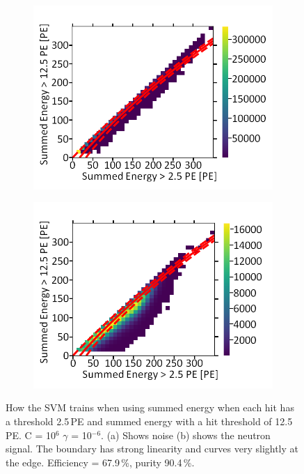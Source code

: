 \begin{figure}[!h]
\centering
\begin{subfigure}{.5\textwidth}
  \centering
  \includegraphics[width=\linewidth]{Appendix1/Figs/Sum1Sum2Noise.png}
  \captionsetup{width=.9\linewidth}
  \caption{}
  \label{subFig:Sum1Sum2N}
\end{subfigure}%
\begin{subfigure}{.5\textwidth}
  \centering
\includegraphics[width=\linewidth]{Appendix1/Figs/Sum1Sum2Signal.png}
  \captionsetup{width=.9\linewidth}
  \caption{}
  \label{subFig:Sum1Sum2S}
\end{subfigure}
\caption[LIBLINEAR SVM Nyström approximated RBF kernel for summed energy > 12.5\,PE vs summed energy > 2.5\,PE.]{How the SVM trains when using summed energy when each hit has a threshold 2.5\,PE and summed energy with a hit threshold of 12.5\,PE. C = 10$^6$ $\gamma$ = 10$^{-6}$. (a) Shows noise (b) shows the neutron signal. The boundary has strong linearity and curves very slightly at the edge. Efficiency = 67.9\,\%, purity 90.4\,\%.}
\label{fig:Sum1Sum2SN}
\end{figure}

